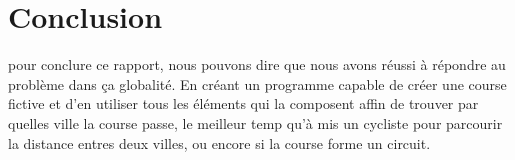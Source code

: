 \section{Conclusion}\label{conclusion}
pour conclure ce rapport, nous pouvons dire que nous avons réussi à répondre au problème dans ça globalité.
En créant un programme capable de créer une course fictive et d'en utiliser tous les éléments qui la composent affin de trouver par quelles ville la course passe,
le meilleur temp qu'à mis un cycliste pour parcourir la distance entres deux villes, ou encore si la course forme un circuit. 
